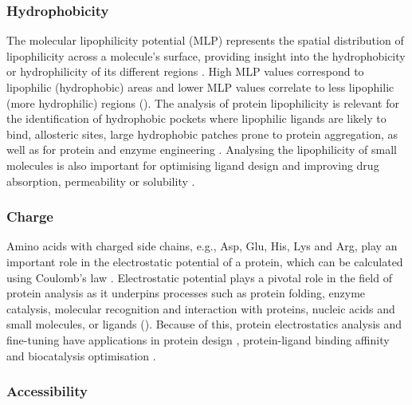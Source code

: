 \subsubsection{Hydrophobicity}

The molecular lipophilicity potential (MLP) represents the spatial distribution of lipophilicity across a molecule’s surface, providing insight into the hydrophobicity or hydrophilicity of its different regions \cite{BROTO_1984_MLP, LAGUERRE_1997_MLP}. High MLP values correspond to lipophilic (hydrophobic) areas and lower MLP values correlate to less lipophilic (more hydrophilic) regions (). The analysis of protein lipophilicity is relevant for the identification of hydrophobic pockets where lipophilic ligands are likely to bind, allosteric sites, large hydrophobic patches prone to protein aggregation, as well as for protein and enzyme engineering \cite{EFREMOV_2007_MLP}. Analysing the lipophilicity of small molecules is also important for optimising ligand design and improving drug absorption, permeability or solubility \cite{GAILLARD_1994_MLP}.

\subsubsection{Charge}

Amino acids with charged side chains, e.g., Asp, Glu, His, Lys and Arg, play an important role in the electrostatic potential of a protein, which can be calculated using Coulomb's law \cite{COULOMB_1785_LAW}. Electrostatic potential plays a pivotal role in the field of protein analysis as it underpins processes such as protein folding, enzyme catalysis, molecular recognition and interaction with proteins, nucleic acids and small molecules, or ligands \cite{ZHOU_2018_ESP} (). Because of this, protein electrostatics analysis and fine-tuning have applications in protein design \cite{GORHAM_2011_ESP}, protein-ligand binding affinity \cite{KUKIC_2010_ELECTROSTATICS} and biocatalysis optimisation \cite{VASCON_2020_ESP}.

\subsubsection{Accessibility}

